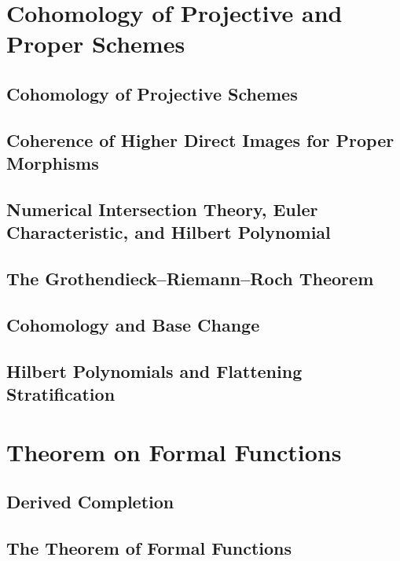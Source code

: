 \documentclass[11pt, a4paper]{article}
\begin{document}
\section{Cohomology of Projective and Proper Schemes}

\subsection{Cohomology of Projective Schemes}

\subsection{Coherence of Higher Direct Images for Proper Morphisms}

\subsection{Numerical Intersection Theory, Euler Characteristic, and Hilbert Polynomial}

\subsection{The Grothendieck--Riemann--Roch Theorem}

\subsection{Cohomology and Base Change}

\subsection{Hilbert Polynomials and Flattening Stratification}

\section{Theorem on Formal Functions}

\subsection{Derived Completion}

\subsection{The Theorem of Formal Functions}
\end{document}
